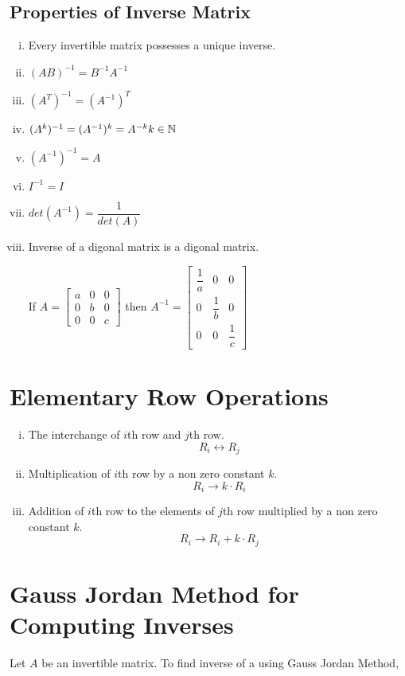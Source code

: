 \documentclass{article}
\begin{document}
\subsection{Properties of Inverse Matrix}
\begin{enumerate}[i.]
    \item Every invertible matrix possesses a unique inverse.
    \item $(AB)^{-1}=B^{-1}A^{-1}$
    \item $(A^T)^{-1}=(A^{-1})^T$
    \item $(A^k)^{-1}=(A^{-1})^k=A^{-k} \hfill k \in \mathbb{N}$
    \item $(A^{-1})^{-1}=A$
    \item $I^{-1}=I$
    \item $det(A^{-1})=\dfrac{1}{det(A)}$
    \item Inverse of a digonal matrix is a digonal matrix.

          If $A=\begin{bmatrix}
                  a & 0 & 0 \\
                  0 & b & 0 \\
                  0 & 0 & c
              \end{bmatrix}$ then $A^{-1}=\begin{bmatrix}
                  \dfrac{1}{a} & 0            & 0            \\
                  0            & \dfrac{1}{b} & 0            \\
                  0            & 0            & \dfrac{1}{c}
              \end{bmatrix}$
\end{enumerate}
\section{Elementary Row Operations}
\begin{enumerate}[i.]
    \item The interchange of $i$th row and $j$th row.
          $$R_{i} \leftrightarrow R_{j}$$
    \item Multiplication of $i$th row by a non zero constant $k$.
          $$R_{i} \rightarrow k\cdot R_{i}$$
    \item Addition of $i$th row to the elements of $j$th row multiplied by a non zero constant $k$.
          $$R_{i} \rightarrow R_{i}+ k \cdot R_{j}$$
\end{enumerate}
\section{Gauss Jordan Method for Computing Inverses}
Let $A$ be an invertible matrix. To find inverse of a using Gauss Jordan Method,
\end{document}
